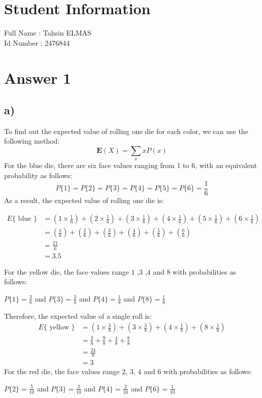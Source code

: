 \documentclass[12pt]{article}
\begin{document}
\section*{Student Information } 
Full Name : Tahsin ELMAS     \\
Id Number :  2476844 \\

\section*{Answer 1}

\subsection*{a)} 
To find out the expected value of rolling one die for each color, we can use the following method:\\
$$\mathbf{E}(X)=\sum_x x P(x)$$
For the blue die, there are six face values ranging from 1 to 6, with an equivalent probability as follows:  $$P\{1\}=P\{2\}=P\{3\}=P\{4\}=P\{5\}=P\{6\}=\frac{1}{6}$$ 
As a result, the expected value of rolling one die is:

\begin{align*}
E\{\text { blue }\}&=(1\times \frac{1}{6})+ (2\times \frac{1}{6})+(3\times \frac{1}{6})+(4\times \frac{1}{6})+(5\times \frac{1}{6})+(6\times \frac{1}{6})\\
&=(\frac{1}{6})+(\frac{2}{6})+(\frac{3}{6})+(\frac{4}{6})+(\frac{5}{6})+(\frac{6}{6})\\
&= \frac{21}{6}\\
&= 3.5
\end{align*}

For the yellow die, the face values range  $1$ ,$3$ ,$4$ and $8$  with probabilities as follows: \\
\begin{center}
$P\{1\}=\frac{3}{8}$ and $P\{3\} = \frac{3}{8}$ and $P\{4\} = \frac{1}{8}$ and $P\{8\} = \frac{1}{8}$
\end{center}

Therefore, the expected value of a single  roll is:
\begin{align*}
E\{\text { yellow }\} &= (1 \times \frac{3}{8}) +(3 \times \frac{3}{8})+(4 \times \frac{1}{8})+(8 \times \frac{1}{8})\\
&= \frac{3}{8}+\frac{9}{8}+\frac{4}{8}+\frac{8}{8}\\
&= \frac{24}{8}\\
&= 3
\end{align*}
\newpage
For the red die, the face values range  $2$, $3$, $4$ and $6$ with probabilities as follows:\\
\begin{center}
$P\{2\} = \frac{5}{10}$ and $P\{3\} = \frac{2}{10}$ and $P\{4\} = \frac{2}{10}$ and $P\{6\} = \frac{1}{10}$
\end{center}
\end{document}
